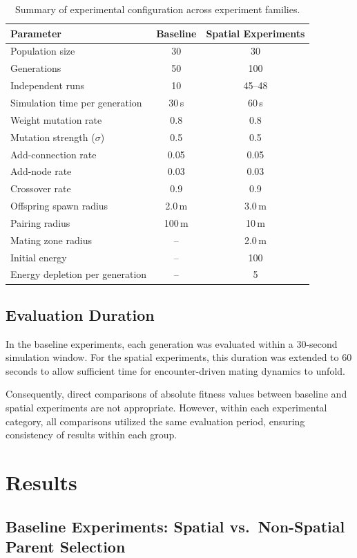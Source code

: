 \documentclass[dvipsnames,format=sigconf,anonymous=false,review=false]{acmart}
\begin{document}
\begin{table}[h]
\centering
\caption{Summary of experimental configuration across experiment families.}
\begin{tabular}{lcc}
\hline
Parameter & Baseline & Spatial Experiments \\
\hline
Population size & 30 & 30 \\
Generations & 50 & 100 \\
Independent runs & 10 & 45--48 \\
Simulation time per generation & 30\,s & 60\,s \\
Weight mutation rate & 0.8 & 0.8 \\
Mutation strength ($\sigma$) & 0.5 & 0.5 \\
Add-connection rate & 0.05 & 0.05 \\
Add-node rate & 0.03 & 0.03 \\
Crossover rate & 0.9 & 0.9 \\
Offspring spawn radius & 2.0\,m & 3.0\,m \\
Pairing radius & 100\,m & 10\,m \\
Mating zone radius & -- & 2.0\,m \\
Initial energy & -- & 100 \\
Energy depletion per generation & -- & 5 \\
\hline
\end{tabular}
\end{table}

\subsection{Evaluation Duration}

In the baseline experiments, each generation was evaluated within a 30-second simulation window. For the spatial experiments, this duration was extended to 60 seconds to allow sufficient time for encounter-driven mating dynamics to unfold. 

Consequently, direct comparisons of absolute fitness values between baseline and spatial experiments are not appropriate. However, within each experimental category, all comparisons utilized the same evaluation period, ensuring consistency of results within each group.


\section{Results}

\subsection{Baseline Experiments: Spatial vs.\ Non-Spatial Parent Selection}
\end{document}
